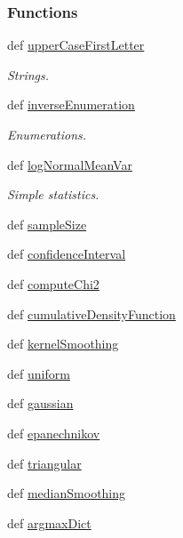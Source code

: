 \subsubsection*{Functions}
\begin{DoxyCompactItemize}
\item 
def \hyperlink{namespaceutils_af2a6fcadbc4660dbc2e36dcb4af82f85}{upper\-Case\-First\-Letter}
\begin{DoxyCompactList}\small\item\em Strings. \end{DoxyCompactList}\item 
def \hyperlink{namespaceutils_ad6e2839437b1cc265f6c89f24780e3de}{inverse\-Enumeration}
\begin{DoxyCompactList}\small\item\em Enumerations. \end{DoxyCompactList}\item 
def \hyperlink{namespaceutils_a262786e298c268eb2c36a8ad55c7666f}{log\-Normal\-Mean\-Var}
\begin{DoxyCompactList}\small\item\em Simple statistics. \end{DoxyCompactList}\item 
def \hyperlink{namespaceutils_ae20fd67019e08a358a853edebee403d9}{sample\-Size}
\item 
def \hyperlink{namespaceutils_afc2584b917cda374480d395bb8b7c2f8}{confidence\-Interval}
\item 
def \hyperlink{namespaceutils_a8a12dd49817bde373a07c36baab8a3c9}{compute\-Chi2}
\item 
def \hyperlink{namespaceutils_ac7ee055d5e2642bd3ded832fa8e35568}{cumulative\-Density\-Function}
\item 
def \hyperlink{namespaceutils_ae29cc6c11cec60ccf921bbd7d29582ea}{kernel\-Smoothing}
\item 
def \hyperlink{namespaceutils_adced339b7e7f320b9af353f9a5b97b3f}{uniform}
\item 
def \hyperlink{namespaceutils_a3e4d29cfeb9ee1e32e82b3bf85470c97}{gaussian}
\item 
def \hyperlink{namespaceutils_a47219a94987309bd574a6e6792d3f79d}{epanechnikov}
\item 
def \hyperlink{namespaceutils_a642426a63b1a0c84b123bf2a0ab9804a}{triangular}
\item 
def \hyperlink{namespaceutils_a6e2c30456ef79d471f8159f56923f568}{median\-Smoothing}
\item 
def \hyperlink{namespaceutils_a37d6ac8b00492b28fc3371683a9e238f}{argmax\-Dict}

\end{DoxyCompactItemize}
